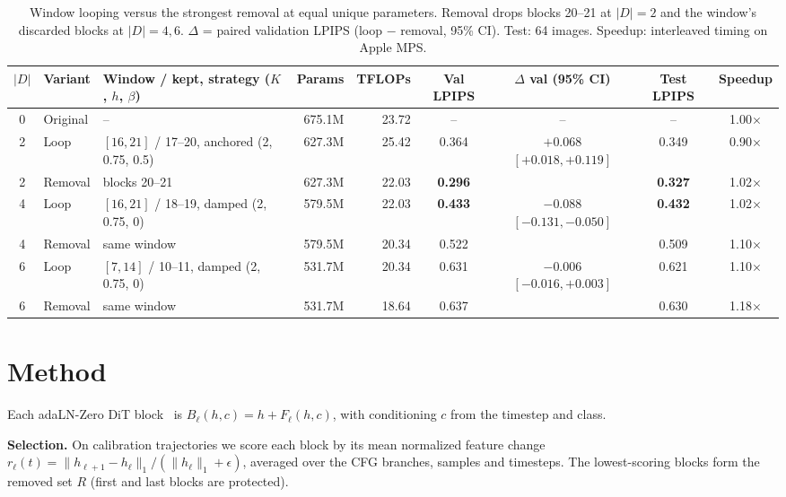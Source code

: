 \documentclass[sigconf,nonacm]{acmart}
\begin{document}
\begin{table}[t]
  \caption{Window looping versus the strongest removal at equal unique parameters.
  Removal drops blocks 20--21 at $|D|=2$ and the window's discarded blocks at $|D|=4,6$.
  $\Delta$ = paired validation LPIPS (loop $-$ removal, 95\% CI). Test: 64 images.
  Speedup: interleaved timing on Apple MPS.}
  \label{tab:window}
  \small
  \begin{tabular}{cllrrcccc}
    \toprule
    $|D|$ & Variant & Window / kept, strategy ($K$, $h$, $\beta$) & Params & TFLOPs &
      Val LPIPS & $\Delta$ val (95\% CI) & Test LPIPS & Speedup\\
    \midrule
    0 & Original & -- & 675.1M & 23.72 & -- & -- & -- & 1.00$\times$\\
    \midrule
    2 & Loop    & $[16,21]$ / 17--20, anchored (2, 0.75, 0.5) & 627.3M & 25.42 & 0.364 & $+0.068$ $[+0.018,+0.119]$ & 0.349 & 0.90$\times$\\
    2 & Removal & blocks 20--21                              & 627.3M & 22.03 & \textbf{0.296} & & \textbf{0.327} & 1.02$\times$\\
    \midrule
    4 & Loop    & $[16,21]$ / 18--19, damped (2, 0.75, 0)    & 579.5M & 22.03 & \textbf{0.433} & $-0.088$ $[-0.131,-0.050]$ & \textbf{0.432} & 1.02$\times$\\
    4 & Removal & same window                                & 579.5M & 20.34 & 0.522 & & 0.509 & 1.10$\times$\\
    \midrule
    6 & Loop    & $[7,14]$ / 10--11, damped (2, 0.75, 0)     & 531.7M & 20.34 & 0.631 & $-0.006$ $[-0.016,+0.003]$ & 0.621 & 1.10$\times$\\
    6 & Removal & same window                                & 531.7M & 18.64 & 0.637 & & 0.630 & 1.18$\times$\\
    \bottomrule
  \end{tabular}
\end{table}

\section{Method}

Each adaLN-Zero DiT block~\cite{peebles2023dit} is $B_\ell(h,c)=h+F_\ell(h,c)$, with
conditioning $c$ from the timestep and class.

\textbf{Selection.} On calibration trajectories we score each block by its mean
normalized feature change $r_\ell(t)=\lVert h_{\ell+1}-h_\ell\rVert_1/(\lVert h_\ell\rVert_1+\epsilon)$,
averaged over the CFG branches, samples and timesteps. The lowest-scoring blocks form the
removed set $R$ (first and last blocks are protected).
\end{document}

